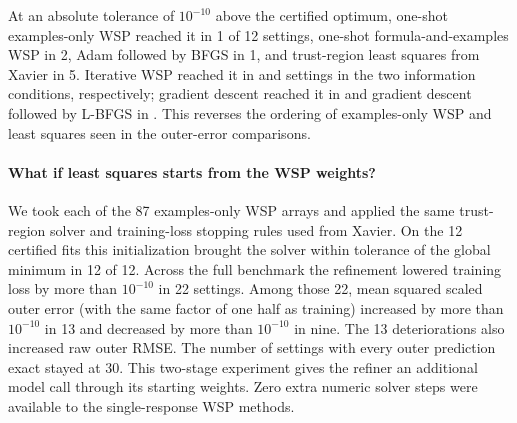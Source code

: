 At an absolute tolerance of $10^{-10}$ above the certified optimum, one-shot examples-only WSP reached it in 1 of 12 settings, one-shot formula-and-examples WSP in 2, Adam followed by BFGS in 1, and trust-region least squares from Xavier in 5. Iterative WSP reached it in \certIterE{} and \certIterF{} settings in the two information conditions, respectively; gradient descent reached it in \certGD{} and gradient descent followed by L-BFGS in \certGL{}. This reverses the ordering of examples-only WSP and least squares seen in the outer-error comparisons.

\paragraph{What if least squares starts from the WSP weights?}
We took each of the 87 examples-only WSP arrays and applied the same trust-region solver and training-loss stopping rules used from Xavier. On the 12 certified fits this initialization brought the solver within tolerance of the global minimum in 12 of 12. Across the full benchmark the refinement lowered training loss by more than $10^{-10}$ in 22 settings. Among those 22, mean squared scaled outer error (with the same factor of one half as training) increased by more than $10^{-10}$ in 13 and decreased by more than $10^{-10}$ in nine. The 13 deteriorations also increased raw outer RMSE. The number of settings with every outer prediction exact stayed at 30. This two-stage experiment gives the refiner an additional model call through its starting weights. Zero extra numeric solver steps were available to the single-response WSP methods.
